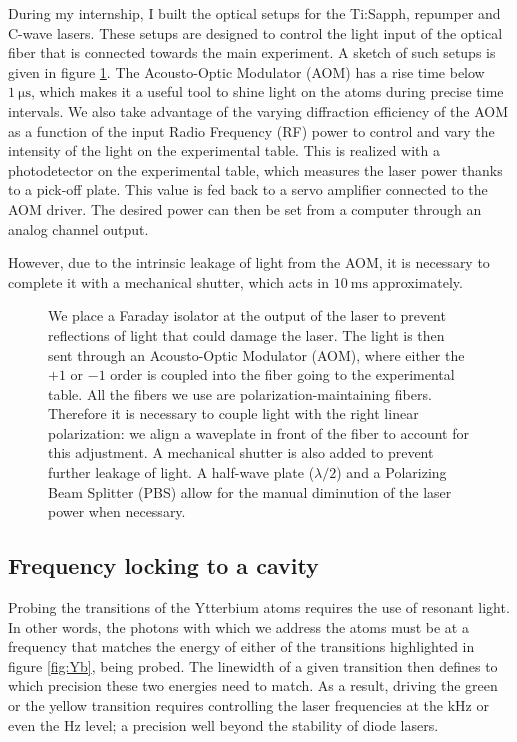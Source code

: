 \documentclass[11pt]{article}
\numberwithin{equation}{section}
\numberwithin{figure}{section}
\begin{document}
During my internship, I built the optical setups for the Ti:Sapph, repumper and C-wave lasers. These setups are designed to control the light input of the optical fiber that is connected towards the main experiment. A sketch of such setups is given in figure \ref{fig:laser_setup}. The Acousto-Optic Modulator (AOM) has a rise time below $\SI{1}{\micro\second}$, which makes it a useful tool to shine light on the atoms during precise time intervals. We also take advantage of the varying diffraction efficiency of the AOM as a function of the input Radio Frequency (RF) power to control and vary the intensity of the light on the experimental table. This is realized with a photodetector on the experimental table, which measures the laser power thanks to a pick-off plate. This value is fed back to a servo amplifier connected to the AOM driver. The desired power can then be set from a computer through an analog channel output.

However, due to the intrinsic leakage of light from the AOM, it is necessary to complete it with a mechanical shutter, which acts in $\SI{10}{\milli\second}$ approximately.

%
\begin{figure}[htbp]
	\centering
	\def\svgwidth{0.65\linewidth}
    
	\caption{\small We place a Faraday isolator at the output of the laser to prevent reflections of light that could damage the laser. The light is then sent through an Acousto-Optic Modulator (AOM), where either the $+1$ or $-1$ order is coupled into the fiber going to the experimental table. All the fibers we use are polarization-maintaining fibers. Therefore it is necessary to couple light with the right linear polarization: we align a waveplate in front of the fiber to account for this adjustment. A mechanical shutter is also added to prevent further leakage of light. A half-wave plate ($\lambda/2$) and a Polarizing Beam Splitter (PBS) allow for the manual diminution of the laser power when necessary.}
    \label{fig:laser_setup}
\end{figure}
%


\subsection{Frequency locking to a cavity}
\label{sec:cavity}

Probing the transitions of the Ytterbium atoms requires the use of resonant light. In other words, the photons with which we address  the atoms must be at a frequency that matches the  energy of either of the transitions highlighted in figure \ref{fig:Yb}, being probed. The linewidth of a given transition then defines to which precision these two energies need to match. As a result, driving the green or the yellow transition requires controlling the laser frequencies at the kHz or even the Hz level; a precision well beyond the stability of diode lasers.
\end{document}
